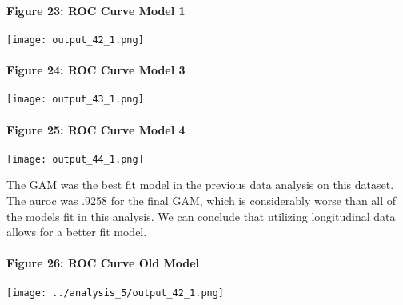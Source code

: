 \documentclass[11pt]{article}
\makeatletter
\def\maxwidth{\ifdim\Gin@nat@width>\linewidth\linewidth
    \else\Gin@nat@width\fi}
\let\Oldincludegraphics\includegraphics
\renewcommand{\includegraphics}[1]{\Oldincludegraphics[width=.8\maxwidth]{#1}}
\makeatother
\begin{document}
    \hypertarget{figure-23-roc-curve-model-1}{%
\paragraph{Figure 23: ROC Curve Model
1}\label{figure-23-roc-curve-model-1}}

    \texttt{[image: output\_42\_1.png]}

    \hypertarget{figure-24-roc-curve-model-3}{%
\paragraph{Figure 24: ROC Curve Model
3}\label{figure-24-roc-curve-model-3}}

    \texttt{[image: output\_43\_1.png]}

    \hypertarget{figure-25-roc-curve-model-4}{%
\paragraph{Figure 25: ROC Curve Model
4}\label{figure-25-roc-curve-model-4}}

    \texttt{[image: output\_44\_1.png]}

    The GAM was the best fit model in the previous data analysis on this
dataset. The auroc was .9258 for the final GAM, which is considerably
worse than all of the models fit in this analysis. We can conclude that
utilizing longitudinal data allows for a better fit model.

    \hypertarget{figure-26-roc-curve-old-model}{%
\paragraph{Figure 26: ROC Curve Old
Model}\label{figure-26-roc-curve-old-model}}

    \texttt{[image: ../analysis\_5/output\_42\_1.png]}


    
    
    
    
\end{document}
